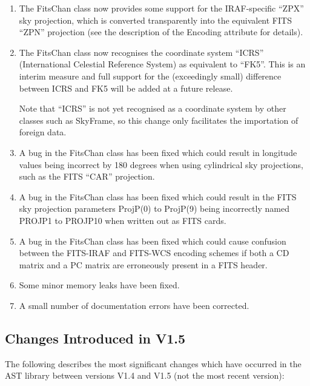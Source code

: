\documentclass[twoside,11pt]{article}
\newcommand{\htmlref}[2]{#1}
\begin{document}
\begin{enumerate}
\item The \htmlref{FitsChan}{FitsChan} class now provides some support for the
IRAF-specific ``ZPX'' sky projection, which is converted transparently
into the equivalent FITS ``ZPN'' projection (see the description of the
\htmlref{Encoding}{Encoding} attribute for details).

\item The FitsChan class now recognises the coordinate system ``ICRS''
(International Celestial Reference \htmlref{System}{System}) as equivalent to
``FK5''. This is an interim measure and full support for the
(exceedingly small) difference between ICRS and FK5 will be added at a
future release.

Note that ``ICRS'' is not yet recognised as a coordinate system by other
classes such as \htmlref{SkyFrame}{SkyFrame}, so this change only facilitates the
importation of foreign data.

\item A bug in the FitsChan class has been fixed which could result in
longitude values being incorrect by 180 degrees when using cylindrical
sky projections, such as the FITS ``CAR'' projection.

\item A bug in the FitsChan class has been fixed which could result in
the FITS sky projection parameters ProjP(0) to ProjP(9) being
incorrectly named PROJP1 to PROJP10 when written out as FITS cards.

\item A bug in the FitsChan class has been fixed which could cause
confusion between the FITS-IRAF and FITS-WCS encoding schemes if both
a CD matrix and a PC matrix are erroneously present in a FITS header.

\item Some minor memory leaks have been fixed.

\item A small number of documentation errors have been corrected.
\end{enumerate}

\subsection{Changes Introduced in V1.5}

The following describes the most significant changes which have
occurred in the AST library between versions V1.4 and V1.5 (not the most
recent version):
\end{document}
